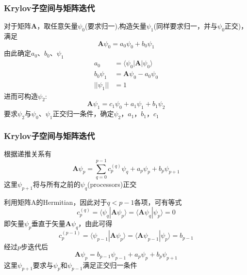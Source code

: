 \frame
{
	\frametitle{\textrm{Krylov}子空间与矩阵迭代}
	对于矩阵$\mathbf{A}$，取任意矢量$\psi_0$(要求归一),构造矢量$\psi_1$(同样要求归一，并与$\psi_0$正交)，满足
	\begin{displaymath}
		\mathbf{A}\psi_0=a_0\psi_0+b_0\psi_1
	\end{displaymath}
	由此确定$a_0$、$b_0$、$\psi_1$
	\begin{displaymath}
		\begin{aligned}
			a_0&=\langle\psi_0|\mathbf{A}|\psi_0\rangle\\
			b_0\psi_1&=\mathbf{A}\psi_0-a_0\psi_0\\
			||\psi_1||&=1
		\end{aligned}
	\end{displaymath}
	进而可构造$\psi_2$:
	\begin{displaymath}
		\mathbf{A}\psi_1=c_1\psi_0+a_1\psi_1+b_1\psi_2
	\end{displaymath}
	要求$\psi_2$与$\psi_0$、$\psi_1$正交归一条件，确定$\psi_2$，$a_1$，$b_1$，$c_1$
}

\frame
{
	\frametitle{\textrm{Krylov}子空间与矩阵迭代}
	根据递推关系有
	\begin{displaymath}
		\mathbf{A}\psi_p=\sum_{q=0}^{p-1}c_p^{(q)}\psi_q+a_p\psi_p+b_p\psi_{p+1}
	\end{displaymath}
	这里$\psi_{p+1}$将与所有之前的$\psi_q$(\textrm{processors})正交

	利用矩阵$\mathrm{A}$的\textrm{Hermitian}，因此对于$q<p-1$各项，可有等式
	\begin{displaymath}
		c_p^{(q)}=\langle\psi_q|\mathbf{A}\psi_p\rangle=\langle\mathbf{A}\psi_q|\psi_p\rangle=0
	\end{displaymath}
	即矢量$\psi_p$垂直于矢量$\mathbf{A}\psi_q$，由此可得
	\begin{displaymath}
		c_p^{(p-1)}=\langle\psi_{p-1}|\mathbf{A}\psi_p\rangle=\langle\mathbf{A}\psi_{p-1}|\psi_p\rangle=b_{p-1}
	\end{displaymath}
	经过$p$步迭代后
	\begin{displaymath}
		\mathbf{A}\psi_p=b_{p-1}\psi_{p-1}+a_p\psi_p+b_p\psi_{p+1}
	\end{displaymath}
	这里$\psi_{p+1}$要求与$\psi_p$和$\psi_{p-1}$满足正交归一条件
}

